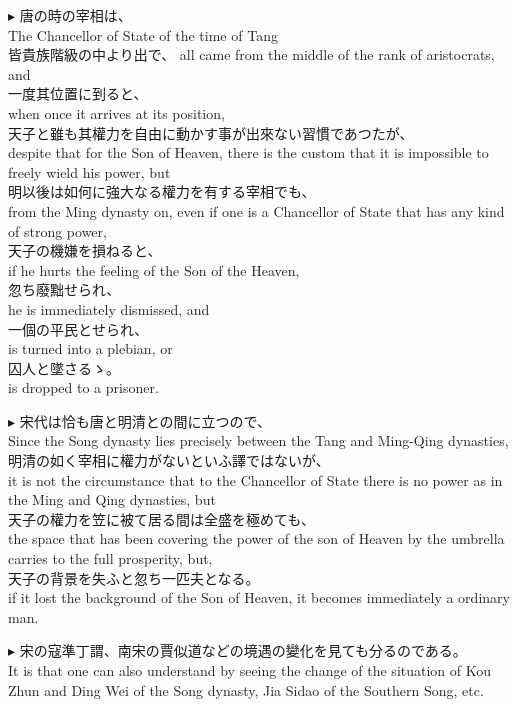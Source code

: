 \documentclass{ctexart}
\makeatletter
\newcommand*{\shifttext}[1]{%
  \settowidth{\@tempdima}{#1}%
  \hspace{-\@tempdima}#1%
}
\newcommand{\plabel}[1]{%
\shifttext{\textbf{#1}\quad}%
}
\makeatother
\begin{document}
\vspace{1em}
\plabel{$\blacktriangleright$}%
唐の時の宰相は、\\
The Chancellor of State of the time of Tang\\
皆貴族階級の中より出で、
all came from the middle of the rank of aristocrats, and\\
一度其位置に到ると、\\
when once it arrives at its position,\\
天子と雖も其權力を自由に動かす事が出來ない習慣であつたが、\\
despite that for the Son of Heaven, there is the custom that it is impossible to freely wield his power, but\\
明以後は如何に強大なる權力を有する宰相でも、\\
from the Ming dynasty on, even if one is a Chancellor of State that has any kind of strong power,\\
天子の機嫌を損ねると、\\
if he hurts the feeling of the Son of the Heaven,\\
忽ち廢黜せられ、\\
he is immediately dismissed, and\\
一個の平民とせられ、\\
is turned into a plebian, or\\
囚人と墜さるゝ。\\
is dropped to a prisoner.

\vspace{1em}
\plabel{$\blacktriangleright$}%
宋代は恰も唐と明清との間に立つので、\\
Since the Song dynasty lies precisely between the Tang and Ming-Qing dynasties,\\
明清の如く宰相に權力がないといふ譯ではないが、\\
it is not the circumstance that to the Chancellor of State there is no power as in the Ming and Qing dynasties, but\\
天子の權力を笠に被て居る間は全盛を極めても、\\
the space that has been covering the power of the son of Heaven by the umbrella carries to the full prosperity, but,\\
天子の背景を失ふと忽ち一匹夫となる。\\
if it lost the background of the Son of Heaven, it becomes immediately a ordinary man.

\vspace{1em}
\plabel{$\blacktriangleright$}%
宋の寇準\textperiodcentered 丁謂、南宋の賈似道などの境遇の變化を見ても分るのである。\\
It is that one can also understand by seeing the change of the situation of Kou Zhun and Ding Wei of the Song dynasty, Jia Sidao of the Southern Song, etc.
\end{document}

